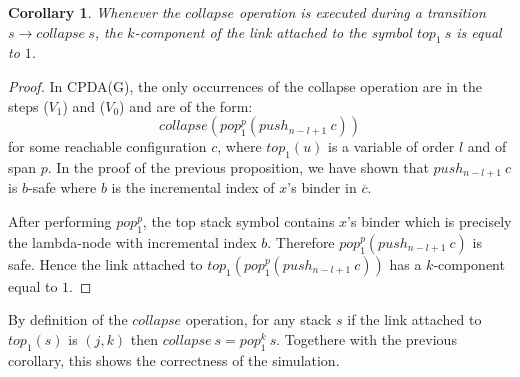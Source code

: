 \documentclass{article}
\newtheorem{corollary}[theorem]{Corollary}
\theoremstyle{remark}
\theoremstyle{definition}
\newcommand\orddec\overline
\begin{document}
\begin{corollary}
Whenever the $collapse$ operation is executed during a
transition $s \rightarrow collapse~s$, the $k$-component of the link attached to the symbol $top_1~s$ is equal to $1$.
\end{corollary}
\begin{proof}
  In CPDA(G), the only occurrences of the collapse operation are in the steps ($V_1$) and ($V_0$) and are of the form:
$$ collapse(pop_1^p(push_{n-l+1}~c))$$
for some reachable configuration $c$, where $top_1(u)$ is a variable of order $l$ and of span $p$. In the proof of the previous proposition, we have shown that
$push_{n-l+1}~c$ is $b$-safe where $b$ is the incremental index of $x$'s binder in $\orddec{c}$. 

After performing $pop_1^p$, the top stack symbol contains $x$'s
binder which is precisely the lambda-node with incremental index $b$. Therefore $pop^p_1(push_{n-l+1}~c)$ is safe. Hence the link attached to $top_1 (pop^p_1(push_{n-l+1}~c))$ has a $k$-component equal to $1$.
\end{proof}

By definition of the $collapse$ operation, for any stack $s$ if the link attached to $top_1(s)$ is $(j,k)$ then $collapse~s = pop_1^k~s$.
Togethere with the previous corollary, this shows the correctness of the simulation. 



\end{document}
